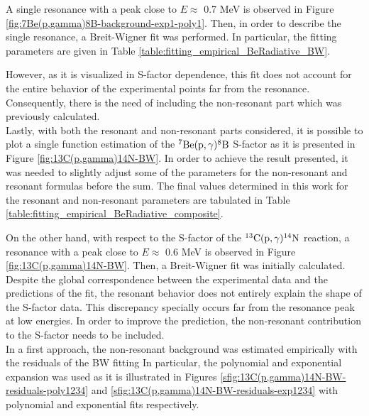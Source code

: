 \documentclass[openany]{book}
\begin{document}
A single resonance with a peak close to $E \approx$ 0.7 MeV is observed in Figure \ref{fig:7Be(p,gamma)8B-background-exp1-poly1}. Then, in order to describe the single resonance, a Breit-Wigner fit was performed. In particular, the fitting parameters are given in Table \ref{table:fitting_empirical_BeRadiative_BW}.

However, as it is visualized in S-factor dependence, this fit does not account for the entire behavior of the experimental points far from the resonance. Consequently, there is the need of including the non-resonant part which was previously calculated. \\

Lastly, with both the resonant and non-resonant parts considered, it is possible to plot a single function estimation of the $\mathrm{{}^{7}Be(p, \gamma){}^{8}B}$ S-factor as it is presented in Figure \ref{fig:13C(p,gamma)14N-BW}. In order to achieve the result presented, it was needed to slightly adjust some of the parameters for the non-resonant and resonant formulas before the sum. The final values determined in this work for the resonant and non-resonant parameters are tabulated in Table \ref{table:fitting_empirical_BeRadiative_composite}. \\

 



On the other hand, with respect to the S-factor of the $\mathrm{{}^{13}C(p, \gamma){}^{14}N}$ reaction, a resonance with a peak close to $E\approx$  0.6 MeV is observed in Figure \ref{fig:13C(p,gamma)14N-BW}. Then, a Breit-Wigner fit was initially calculated.  \\


Despite the global correspondence between the experimental data and the predictions of the fit, the resonant behavior does not entirely explain the shape of the S-factor data. This discrepancy specially  occurs far from the resonance peak at low energies. In order to improve the prediction, the non-resonant contribution to the S-factor needs to be included. \\

In a first approach, the non-resonant background was estimated empirically with the residuals of the BW fitting In particular, the polynomial and exponential expansion was used as it is illustrated in Figures \ref{sfig:13C(p,gamma)14N-BW-residuals-poly1234} and \ref{sfig:13C(p,gamma)14N-BW-residuals-exp1234} with polynomial and exponential fits respectively.
\end{document}

